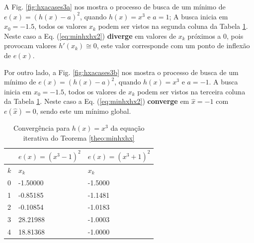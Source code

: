 \begin{example}\label{ex:minhxhx3}
 A Fig. \ref{fig:hxacases3a} nos mostra o processo de busca de um mínimo
 de $e(x)=(h(x)-a)^2$, quando $h(x)=x^3$ e $a=1$; A busca inicia em $x_0=-1.5$,
 todos os valores $x_{k}$ podem ser vistos na segunda coluna da
Tabela \ref{tab:hxacases3}. Neste caso a Eq. (\ref{eq:minhxhx2}) \textbf{diverge} em 
valores de $x_{k}$ próximos a $0$, pois provocam valores  $h'(x_{k})\cong 0$,
este valor corresponde com um ponto de inflexão de $e(x)$.

 Por outro lado, a Fig. \ref{fig:hxacases3b} nos mostra o processo de busca de um mínimo
 de $e(x)=(h(x)-a)^2$, quando $h(x)=x^3$ e $a=-1$. A busca inicia em $x_0=-1.5$,
 todos os valores de $x_{k}$ podem ser vistos na terceira coluna da
Tabela \ref{tab:hxacases3}. Neste caso a Eq. (\ref{eq:minhxhx2}) \textbf{converge} 
em $\hat{x}=-1$ com $e(\hat{x})=0$, sendo este um mínimo global.

\end{example}

\begin{table}[!h]
\centering
\begin{tabular}{|l|l|l|}
\hline
~&$e(x)=(x^3-1)^2$ & $e(x)=(x^3+1)^2$ \\ \hline
$k$&$x_k$  & $x_k$ \\ \hline
0&-1.50000  & -1.5000   \\
1&-0.85185  & -1.1481   \\
2&-0.10854  & -1.0183   \\
3&28.21988  & -1.0003   \\
4&18.81368  & -1.0000   \\  \hline
\end{tabular}
\caption{Convergência para $h(x)=x^3$ da equação iterativa do Teorema \ref{theo:minhxhx}}
\label{tab:hxacases3}
\end{table}


